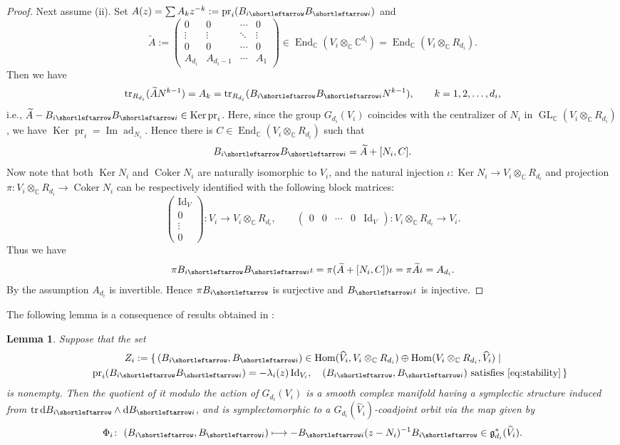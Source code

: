 \documentclass[pdftex]{sigma}
\newcommand{\slar}{\shortleftarrow}
\numberwithin{equation}{section}
\newtheorem{Lemma}[Theorem]{Lemma}
\theoremstyle{definition}
\newcommand{\C}{\mathbb{C}} %
\newcommand{\GL}{\operatorname{GL}} %
\newcommand{\g}{\mathfrak{g}} %
\newcommand{\ad}{\operatorname{ad}}
\newcommand{\End}{\operatorname{End}}
\newcommand{\Hom}{\operatorname{Hom}}
\newcommand{\Ker}{\operatorname{Ker}}
\newcommand{\range}{\operatorname{Im}}
\newcommand{\Coker}{\operatorname{Coker}}
\newcommand{\tr}{\operatorname{tr}}
\newcommand{\unit}{\mathrm{Id}}
\newcommand{\prj}{\operatorname{pr}}
\newcommand{\rd}{\mathop{\mathrm{d}\!}\mathstrut}
\begin{document}
\begin{proof}
Next assume (ii).
Set $A(z)=\sum A_k z^{-k}:=\prj_i(B_{i \slar}B_{\slar i})$ and
\[
\widetilde{A} :=
\begin{pmatrix}
0 & 0 & \cdots & 0 \\
\vdots & \vdots & \ddots & \vdots \\
0 & 0 & \cdots & 0 \\
A_{d_i} & A_{d_i-1} & \cdots & A_1
\end{pmatrix}
\in \End_\C(V_i \otimes_\C \C^{d_i})=\End_\C(V_i \otimes_\C R_{d_i}).
\]
Then we have
\[
\tr_{R_{d_i}}(\widetilde{A}N^{k-1}) = A_k
= \tr_{R_{d_i}}(B_{i \slar}  B_{\slar i}N^{k-1}),
\qquad k=1,2,\dots ,d_i,
\]
i.e., $\widetilde{A}-B_{i \slar}B_{\slar i} \in \Ker \prj_i$.
Here, since the group $G_{d_i}(V_i)$ coincides with the centralizer of $N_i$
in $\GL_\C(V_i \otimes_\C R_{d_i})$, we have $\Ker \prj_i = \range \ad_{N_i}$.
Hence there is $C \in \End_\C(V_i \otimes_\C R_{d_i})$ such that
\[
B_{i \slar}  B_{\slar i} = \widetilde{A} + [N_i,C].
\]
Now note that both $\Ker N_i$ and $\Coker N_i$ are naturally isomorphic to $V_i$,
and the natural injection $\iota \colon \Ker N_i \to V_i \otimes_\C R_{d_i}$ and
projection $\pi \colon V_i \otimes_\C R_{d_i} \to \Coker N_i$
can be respectively identif\/ied with
the following block matrices:
\[
\begin{pmatrix} \unit_V \\ 0 \\ \vdots \\ 0
\end{pmatrix} \colon V_i \to V_i \otimes_\C R_{d_i}, \qquad
\begin{pmatrix}
0 & 0 & \cdots & 0 & \unit_V
\end{pmatrix} \colon V_i \otimes_\C R_{d_i} \to V_i.
\]
Thus we have
\begin{gather}\label{eq:momentrel}
\pi B_{i \slar}  B_{\slar i} \iota =
\pi (\widetilde{A} + [N_i,C]) \iota =
\pi \widetilde{A} \iota = A_{d_i}.
\end{gather}
By the assumption $A_{d_i}$ is invertible.
Hence $\pi B_{i \slar}$ is surjective and $B_{\slar i} \iota$ is injective.
\end{proof}


The following lemma is a consequence of results obtained in
\cite{0911.3863}:
\begin{Lemma}\label{lem:orbit1}
Suppose that the set
\begin{gather*}
Z_i :=
\{\, (B_{i \slar},B_{\slar i}) \in \Hom(\widehat{V}_i,V_i\otimes_\C R_{d_i})
\oplus \Hom(V_i\otimes_\C R_{d_i},\widehat{V}_i) \mid \\
\phantom{Z_i := \{\, }{} \prj_i(B_{i \slar}B_{\slar i})=-\lambda_i(z)\,\unit_{V_i},\quad
\text{\rm $(B_{i \slar}, B_{\slar i})$
satisfies \eqref{eq:stability}}
\,\}
\end{gather*}
is nonempty.
Then the quotient of it modulo the action of $G_{d_i}(V_i)$
is a smooth complex manifold having a
symplectic structure induced from
$\tr \rd B_{i \slar} \wedge \rd B_{\slar i}$,
and is symplectomorphic to
a $G_{d_i}(\widehat{V}_i)$-coadjoint orbit via the map given by
\[
\Phi_i \colon \ (B_{i \slar},B_{\slar i}) \longmapsto
- B_{\slar i}(z-N_i)^{-1}B_{i \slar} \in \g^*_{d_i}(\widehat{V}_i).
\]
\end{Lemma}
\end{document}
